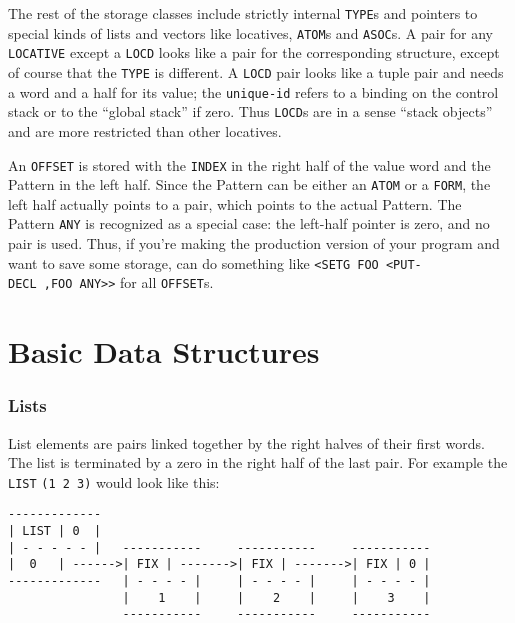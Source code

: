 \documentclass[a4paper]{scrbook}
\begin{document}
The rest of the storage classes include strictly internal \texttt{TYPE}s and pointers to special kinds of lists and vectors
like locatives, \texttt{ATOM}s and \texttt{ASOC}s. A pair for any
\texttt{LOCATIVE} except a \texttt{LOCD} looks like a pair for the corresponding structure, except
of course that the \texttt{TYPE} is different. A \texttt{LOCD} pair looks like a tuple pair and needs a word and a half for
its value; the \texttt{unique-id} refers to a binding on the control stack or to the ``global stack'' if zero. Thus
\texttt{LOCD}s are in a sense ``stack objects'' and are more restricted than other locatives.

An \texttt{OFFSET} is stored with the \texttt{INDEX} in the right half of the value word and the
Pattern in the left half. Since the Pattern can be either an \texttt{ATOM} or a \texttt{FORM}, the
left half actually points to a pair, which points to the actual Pattern. The Pattern \texttt{ANY} is recognized as a
special case: the left-half pointer is zero, and no pair is used. Thus, if you're making the production version of your
program and want to save some storage, can do something like
\texttt{\textless{}SETG\ FOO\ \textless{}PUT-DECL\ ,FOO\ ANY\textgreater{}\textgreater{}} for all \texttt{OFFSET}s.

\section*{Basic Data Structures}
\label{basic-data-structures}

\subsubsection*{Lists}\label{lists}

List elements are pairs linked together by the right halves of their first words. The list is terminated by a zero in the
right half of the last pair. For example the  \texttt{LIST} \texttt{(1\ 2\ 3)} would look like this:

\begin{verbatim}
-------------
| LIST | 0  |
| - - - - - |   -----------     -----------     -----------
|  0   | ------>| FIX | ------->| FIX | ------->| FIX | 0 |
-------------   | - - - - |     | - - - - |     | - - - - |
                |    1    |     |    2    |     |    3    |
                -----------     -----------     -----------
\end{verbatim}
\end{document}
